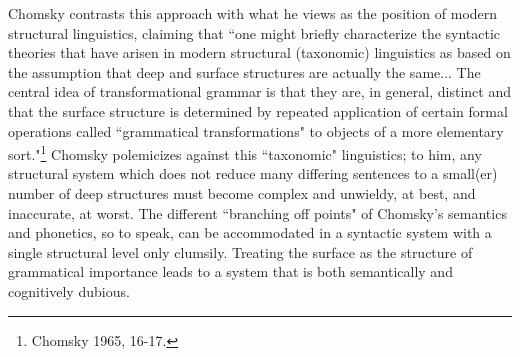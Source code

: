 Chomsky contrasts this approach with what he views as the position of modern structural linguistics, claiming that ``one might briefly characterize the syntactic theories that have arisen in modern structural (taxonomic) linguistics as based on the assumption that deep and surface structures are actually the same... The central idea of transformational grammar is that they are, in general, distinct and that the surface structure is determined by repeated application of certain formal operations called ``grammatical transformations" to objects of a more elementary sort."\footnote{Chomsky 1965, 16-17.}  Chomsky polemicizes against this ``taxonomic" linguistics; to him, any structural system which does not reduce many differing sentences to a small(er) number of deep structures must become complex and unwieldy, at best, and inaccurate, at worst.  The different ``branching off points" of Chomsky's semantics and phonetics, so to speak, can be accommodated in a syntactic system with a single structural level only clumsily.  Treating the surface as the structure of grammatical importance leads to a system that is both semantically and cognitively dubious.

